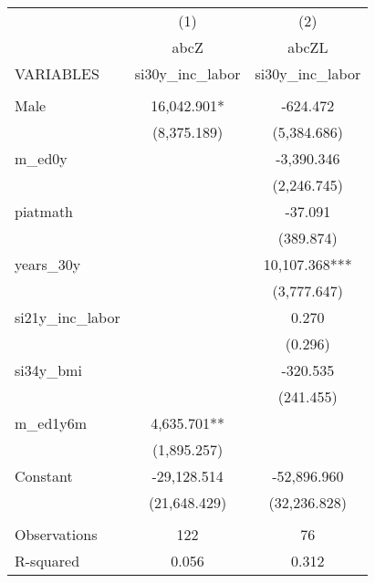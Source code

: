 \begin{tabular}{lcc} \hline
 & (1) & (2) \\
 & abcZ & abcZL \\
VARIABLES & si30y\_inc\_labor & si30y\_inc\_labor \\ \hline
 &  &  \\
Male & 16,042.901* & -624.472 \\
 & (8,375.189) & (5,384.686) \\
m\_ed0y &  & -3,390.346 \\
 &  & (2,246.745) \\
piatmath &  & -37.091 \\
 &  & (389.874) \\
years\_30y &  & 10,107.368*** \\
 &  & (3,777.647) \\
si21y\_inc\_labor &  & 0.270 \\
 &  & (0.296) \\
si34y\_bmi &  & -320.535 \\
 &  & (241.455) \\
m\_ed1y6m & 4,635.701** &  \\
 & (1,895.257) &  \\
Constant & -29,128.514 & -52,896.960 \\
 & (21,648.429) & (32,236.828) \\
 &  &  \\
Observations & 122 & 76 \\
 R-squared & 0.056 & 0.312 \\ \hline
\end{tabular}
